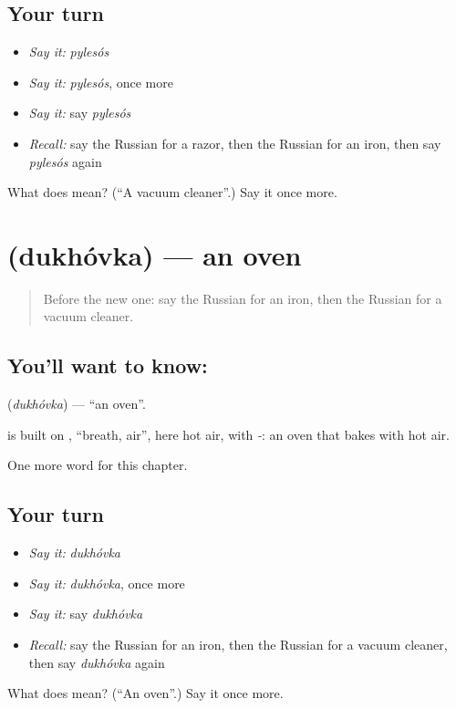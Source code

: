 \subsection*{Your turn}
\begin{itemize}
\raggedright
  \item \emph{Say it:} \emph{pylesós}
  \item \emph{Say it:} \emph{pylesós}, once more
  \item \emph{Say it:} say \emph{pylesós}
  \item \emph{Recall:} say the Russian for a razor, then the Russian for an iron, then say \emph{pylesós} again
\end{itemize}

\begin{tcolorbox}[breakable,colback=teal!4,colframe=teal!35!black,title={Before you move on}]
What does  mean? (\textquotedblleft{}A vacuum cleaner\textquotedblright{}.) Say it once more.
\end{tcolorbox}
\section[\texorpdfstring{\ru{духовка} (dukhóvka)}{духовка (dukhóvka)}]{ (dukhóvka) — an oven}

\label{lesson:RU-C219-dukhovka}



\begin{quote}
Before the new one: say the Russian for an iron, then the Russian for a vacuum cleaner.
\end{quote}

\subsection*{You'll want to know: }
\textbf{} (\emph{dukhóvka}) — \textquotedblleft{}an oven\textquotedblright{}.

\begin{cousinweb}
\textbf{} is built on \emph{}, \textquotedblleft{}breath, air\textquotedblright{}, here hot air, with \emph{-}: an oven that bakes with hot air.
\end{cousinweb}

\begin{grammarlens}[title={What you've built}]
One more word for this chapter.
\end{grammarlens}

\subsection*{Your turn}
\begin{itemize}
\raggedright
  \item \emph{Say it:} \emph{dukhóvka}
  \item \emph{Say it:} \emph{dukhóvka}, once more
  \item \emph{Say it:} say \emph{dukhóvka}
  \item \emph{Recall:} say the Russian for an iron, then the Russian for a vacuum cleaner, then say \emph{dukhóvka} again
\end{itemize}

\begin{tcolorbox}[breakable,colback=teal!4,colframe=teal!35!black,title={Before you move on}]
What does  mean? (\textquotedblleft{}An oven\textquotedblright{}.) Say it once more.
\end{tcolorbox}
